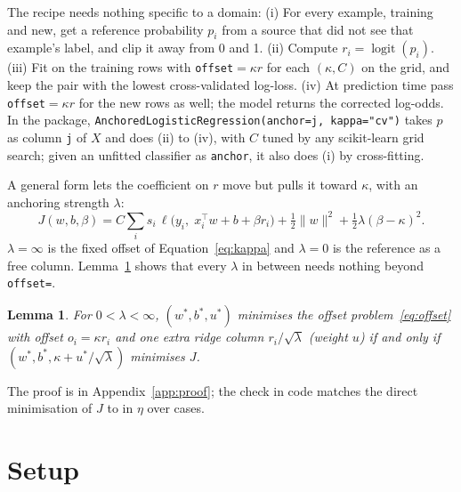 \documentclass{article}
\newtheorem{lemma}{Lemma}
\newcommand{\code}[1]{\texttt{#1}}
\begin{document}
The recipe needs nothing specific to a domain: (i) For every example, training and new, get a reference probability $p_i$ from a source that did not see that example's label, and clip it away from 0 and 1.
(ii) Compute $r_i = \operatorname{logit}(p_i)$.
(iii) Fit on the training rows with \code{offset}$= \kappa r$ for each $(\kappa, C)$ on the grid, and keep the pair with the lowest cross-validated log-loss.
(iv) At prediction time pass \code{offset}$= \kappa r$ for the new rows as well; the model returns the corrected log-odds.
In the package, \code{AnchoredLogisticRegression(anchor=j, kappa="cv")} takes $p$ as column \code{j} of $X$ and does (ii) to (iv), with $C$ tuned by any scikit-learn grid search; given an unfitted classifier as \code{anchor}, it also does (i) by cross-fitting.

A general form lets the coefficient on $r$ move but pulls it toward $\kappa$, with an anchoring strength $\lambda$:
\begin{equation}
J(w,b,\beta) = C \sum_{i} s_i\, \ell\bigl(y_i,\; x_i^\top w + b + \beta r_i\bigr) + \tfrac{1}{2}\lVert w\rVert^2 + \tfrac{1}{2}\lambda(\beta-\kappa)^2 .
\label{eq:anchored}
\end{equation}
$\lambda = \infty$ is the fixed offset of Equation~\ref{eq:kappa} and $\lambda = 0$ is the reference as a free column.
Lemma~\ref{lem:anchored} shows that every $\lambda$ in between needs nothing beyond \code{offset=}.

\begin{lemma}\label{lem:anchored}
For $0 < \lambda < \infty$, $(w^*, b^*, u^*)$ minimises the offset problem~\eqref{eq:offset} with offset $o_i = \kappa r_i$ and one extra ridge column $r_i/\sqrt{\lambda}$ (weight $u$) if and only if $(w^*, b^*, \kappa + u^*/\sqrt{\lambda})$ minimises $J$.
\end{lemma}
The proof is in Appendix~\ref{app:proof}; the check in code matches the direct minimisation of $J$ to \nTwinLemTwoEta{} in $\eta$ over \nTwinLemTwoCases{} cases.

\section{Setup}
\label{sec:setup}
\end{document}
